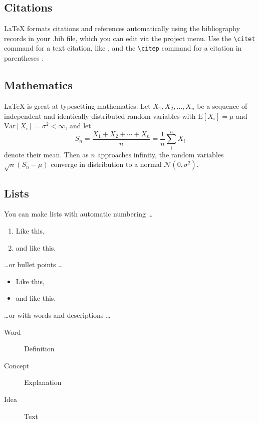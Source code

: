\documentclass[fleqn,10pt]{physiome}
\begin{document}
\subsection{Citations}

LaTeX formats citations and references automatically using the bibliography records in your .bib file, which you can edit via the project menu. Use the \verb|\citet| command for a text citation, like \citet{lees2010theoretical}, and the \verb|\citep| command for a citation in parentheses \citep{McQuilton01012012}.

\subsection{Mathematics}

\LaTeX{} is great at typesetting mathematics. Let $X_1, X_2, \ldots, X_n$ be a sequence of independent and identically distributed random variables with $\text{E}[X_i] = \mu$ and $\text{Var}[X_i] = \sigma^2 < \infty$, and let
\begin{equation}\label{eq:sum}
S_n = \frac{X_1 + X_2 + \cdots + X_n}{n}
      = \frac{1}{n}\sum_{i}^{n} X_i
\end{equation}
denote their mean. Then as $n$ approaches infinity, the random variables $\sqrt{n}(S_n - \mu)$ converge in distribution to a normal $\mathcal{N}(0, \sigma^2)$.

\subsection{Lists}

You can make lists with automatic numbering \dots

\begin{enumerate}[noitemsep] 
\item Like this,
\item and like this.
\end{enumerate}
\dots or bullet points \dots
\begin{itemize}[noitemsep] 
\item Like this,
\item and like this.
\end{itemize}
\dots or with words and descriptions \dots
\begin{description}
\item[Word] Definition
\item[Concept] Explanation
\item[Idea] Text
\end{description}
\end{document}
